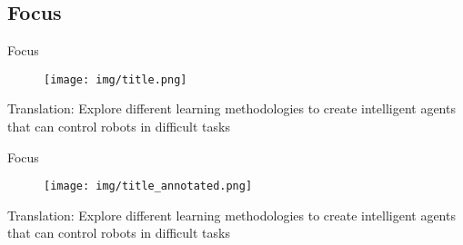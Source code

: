 
\subsection{Focus}

\begin{frame}{Focus}
  \begin{figure}
    \centering
    \texttt{[image: img/title.png]}
  \end{figure}
  \pause
  Translation: Explore different learning methodologies to create intelligent agents that can control robots in difficult tasks
\end{frame}
\begin{frame}{Focus}
  \begin{figure}
    \centering
    \texttt{[image: img/title\_annotated.png]}
  \end{figure}
  Translation: Explore different learning methodologies to create intelligent agents that can control robots in difficult tasks
\end{frame}
